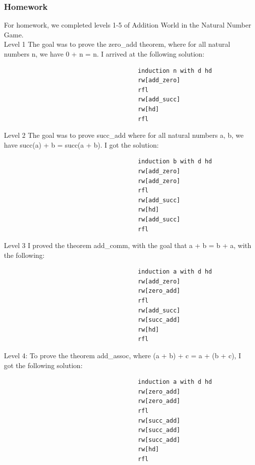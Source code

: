 \documentclass{article}
\theoremstyle{theorem}
\theoremstyle{definition}
\theoremstyle{remark}
\begin{document}
\subsubsection{Homework}
For homework, we completed levels 1-5 of Addition World in the Natural Number Game.\\

Level 1\: The goal was to prove the zero\_add theorem, where for all natural numbers n, we have 0 + n = n. I arrived at the following solution:

\begin{verbatim}
                                      induction n with d hd
                                      rw[add_zero]
                                      rfl
                                      rw[add_succ]
                                      rw[hd]
                                      rfl
\end{verbatim}
Level 2\: The goal was to prove succ\_add where for all natural numbers a, b, we have succ(a) + b = succ(a + b). I got the solution:
\begin{verbatim}
                                      induction b with d hd
                                      rw[add_zero]
                                      rw[add_zero]
                                      rfl
                                      rw[add_succ]
                                      rw[hd]
                                      rw[add_succ]
                                      rfl
\end{verbatim}

Level 3\: I proved the theorem add\_comm, with the goal that a + b = b + a, with the following:
\begin{verbatim}
                                      induction a with d hd
                                      rw[add_zero]
                                      rw[zero_add]
                                      rfl
                                      rw[add_succ]
                                      rw[succ_add]
                                      rw[hd]
                                      rfl
\end{verbatim}

Level 4: To prove the theorem add\_assoc, where (a + b) + c = a + (b + c), I got the following solution:
\begin{verbatim}
                                      induction a with d hd
                                      rw[zero_add]
                                      rw[zero_add]
                                      rfl
                                      rw[succ_add]
                                      rw[succ_add]
                                      rw[succ_add]
                                      rw[hd]
                                      rfl
\end{verbatim}
\end{document}
